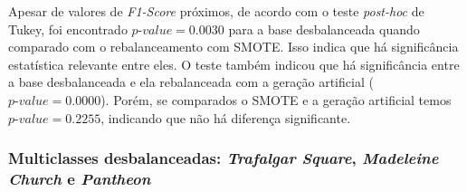 Apesar de valores de \textit{F1-Score} próximos, de acordo com o teste \textit{post-hoc} de Tukey, foi encontrado $\textit{p-value} = 0.0030$ para a base desbalanceada quando comparado com o rebalanceamento com SMOTE. Isso indica que há significância estatística relevante entre eles. O teste também indicou que há significância entre a base desbalanceada e ela rebalanceada com a geração artificial ($\textit{p-value} = 0.0000$). Porém, se comparados o SMOTE e a geração artificial temos $\textit{p-value} = 0.2255$, indicando que não há diferença significante.

\subsubsection{Multiclasses desbalanceadas: \textit{Trafalgar Square}, \textit{Madeleine Church} e \textit{Pantheon}}

